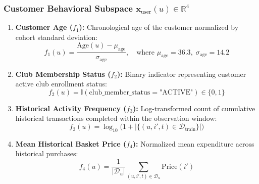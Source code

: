 \subsubsection{Customer Behavioral Subspace $\mathbf{x}_{\text{user}}(u) \in \mathbb{R}^4$}
\begin{enumerate}
    \item \textbf{Customer Age ($f_1$):} Chronological age of the customer normalized by cohort standard deviation:
    \begin{equation}
        f_1(u) = \frac{\text{Age}(u) - \mu_{\text{age}}}{\sigma_{\text{age}}}, \quad \text{where } \mu_{\text{age}} = 36.3, \; \sigma_{\text{age}} = 14.2
    \end{equation}
    \item \textbf{Club Membership Status ($f_2$):} Binary indicator representing customer active club enrollment status:
    \begin{equation}
        f_2(u) = \mathbb{I}(\text{club\_member\_status} = \text{"ACTIVE"}) \in \{0, 1\}
    \end{equation}
    \item \textbf{Historical Activity Frequency ($f_3$):} Log-transformed count of cumulative historical transactions completed within the observation window:
    \begin{equation}
        f_3(u) = \log_{10}\big(1 + |\{(u, i', t) \in \mathcal{D}_{\text{train}}\}|\big)
    \end{equation}
    \item \textbf{Mean Historical Basket Price ($f_4$):} Normalized mean expenditure across historical purchases:
    \begin{equation}
        f_4(u) = \frac{1}{|\mathcal{D}_u|} \sum_{(u, i', t) \in \mathcal{D}_u} \text{Price}(i')
    \end{equation}
\end{enumerate}

